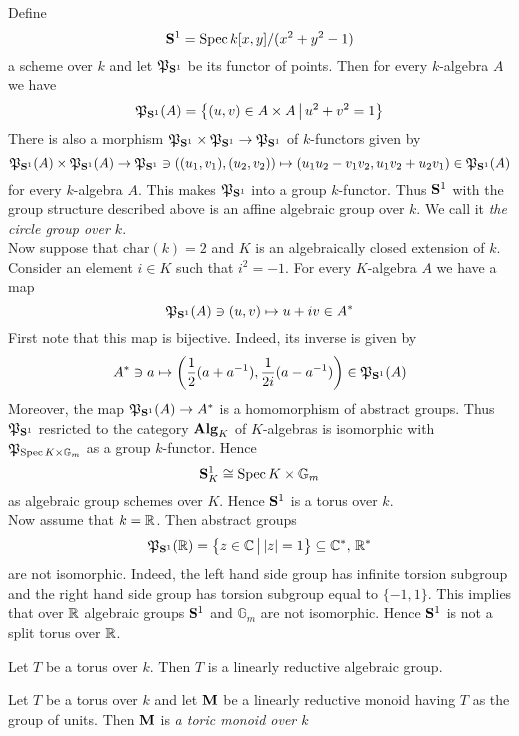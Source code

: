 \begin{example}\label{example:non_split_torus}
Define
$$\mathbf{S}^1 = \mathrm{Spec}\, k[x,y]/(x^2+y^2-1)$$
a scheme over $k$ and let ${\mathfrak P}_{\mathbf{S}^1}$ be its functor of points. Then for every $k$-algebra $A$ we have
$${\mathfrak P}_{\mathbf{S}^1}(A) = \big\{(u,v)\in A\times A\,\big|\,u^2+v^2=1\big\}$$
There is also a morphism ${\mathfrak P}_{\mathbf{S}^1}\times {\mathfrak P}_{\mathbf{S}^1}\rightarrow {\mathfrak P}_{\mathbf{S}^1}$ of $k$-functors given by
$${\mathfrak P}_{\mathbf{S}^1}(A)\times {\mathfrak P}_{\mathbf{S}^1}(A)\rightarrow {\mathfrak P}_{\mathbf{S}^1}\ni \left((u_1,v_1),(u_2,v_2)\right)\mapsto (u_1u_2-v_1v_2,u_1v_2+u_2v_1)\in {\mathfrak P}_{\mathbf{S}^1}(A)$$
for every $k$-algebra $A$. This makes ${\mathfrak P}_{\mathbf{S}^1}$ into a group $k$-functor. Thus $\mathbf{S}^1$ with the group structure described above is an affine algebraic group over $k$. We call it \textit{the circle group over $k$}.\\
Now suppose that $\mathrm{char}(k)=2$ and $K$ is an algebraically closed extension of $k$. Consider an element $i\in K$ such that $i^2 = -1$. For every $K$-algebra $A$ we have a map
$${\mathfrak P}_{\mathbf{S}^1}(A)\ni (u,v)\mapsto u+iv\in A^*$$
First note that this map is bijective. Indeed, its inverse is given by
$$A^*\ni a \mapsto \left(\frac{1}{2}(a+a^{-1}),\frac{1}{2i}(a-a^{-1})\right) \in {\mathfrak P}_{\mathbf{S}^1}(A)$$
Moreover, the map ${\mathfrak P}_{\mathbf{S}^1}(A)\rightarrow A^*$ is a homomorphism of abstract groups. Thus ${\mathfrak P}_{\mathbf{S}^1}$ resricted to the category $\mathbf{Alg}_K$ of $K$-algebras is isomorphic with ${\mathfrak P}_{\mathrm{Spec}\, K\times \mathbb{G}_{m}}$ as a group $k$-functor. Hence
$$\mathbf{S}^1_K \cong \mathrm{Spec}\, K\times \mathbb{G}_{m}$$
as algebraic group schemes over $K$. Hence $\mathbf{S}^1$ is a torus over $k$.\\
Now assume that $k = {\mathbb R}$. Then abstract groups
$${\mathfrak P}_{\mathbf{S}^1}({\mathbb R}) = \big\{z\in {\mathbb C}\,\big|\,|z|=1\big\} \subseteq {\mathbb C}^*,\,{\mathbb R}^*$$
are not isomorphic. Indeed, the left hand side group has infinite torsion subgroup and the right hand side group has torsion subgroup equal to $\{-1,1\}$. This implies that over ${\mathbb R}$ algebraic groups $\mathbf{S}^1$ and $\mathbb{G}_{m}$ are not isomorphic. Hence $\mathbf{S}^1$ is not a split torus over ${\mathbb R}$.
\end{example}

\begin{corollary}\label{corollary:toruses_are_linearly_reductive}
Let $T$ be a torus over $k$. Then $T$ is a linearly reductive algebraic group.
\end{corollary}

\begin{definition}
Let $T$ be a torus over $k$ and let $\mathbf{M}$ be a linearly reductive monoid having $T$ as the group of units. Then $\mathbf{M}$ is \textit{a toric monoid over $k$}
\end{definition}



